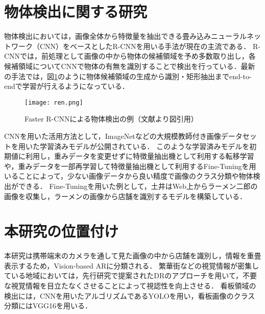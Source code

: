\section{物体検出に関する研究}
  物体検出においては，画像全体から特徴量を抽出できる畳み込みニューラルネットワーク（CNN）\cite{Lecun:1998}をベースとしたR-CNN\cite{Girshick:2014}を用いる手法が現在の主流である\cite{Nakayama:2015}．
  R-CNNでは，前処理として画像の中から物体の候補領域を予め多数取り出し，各候補領域についてCNNで物体の有無を識別することで検出を行っている．最新の手法では，図\ref{figure:ren}のように物体候補領域の生成から識別・矩形抽出までend-to-endで学習が行えるようになっている\cite{Redmon:2017, Ren:2017}．
  \begin{figure}[tb]
    \centerline{\texttt{[image: ren.png]}}
    \caption{Faster R-CNNによる物体検出の例（文献\cite{Ren:2017}より図引用）}
    \label{figure:ren}
  \end{figure}

  CNNを用いた活用方法として，ImageNet\cite{Deng:2009}などの大規模教師付き画像データセットを用いた学習済みモデルが公開されている．
  このような学習済みモデルを初期値に利用し，重みデータを変更せずに特徴量抽出機として利用する転移学習や，重みデータを一部再学習して特徴量抽出機として利用するFine-Tuningを用いることによって，少ない画像データから良い精度で画像のクラス分類や物体検出ができる．
  Fine-Tuningを用いた例として，土井はWeb上からラーメン二郎の画像を収集し，ラーメンの画像から店舗を識別するモデルを構築している\cite{Doi:2018}．

\section{本研究の位置付け}
  本研究は携帯端末のカメラを通して見た画像の中から店舗を識別し，情報を重畳表示するため，Vision-based ARに分類される．
  繁華街などの視覚情報が密集している地域においては，先行研究\cite{Fujita:2013}で提案されたDRのアプローチを用いて，不要な視覚情報を目立たなくさせることによって視認性を向上させる．
  看板領域の検出には，CNNを用いたアルゴリズムであるYOLO\cite{Redmon:2017}を用い，看板画像のクラス分類にはVGG16\cite{Simonyan:2015}を用いる．